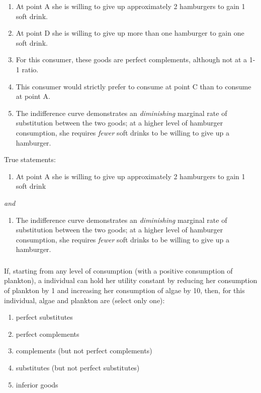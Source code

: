 \documentclass[]{article}
\providecommand{\tightlist}{%
  \setlength{\itemsep}{0pt}\setlength{\parskip}{0pt}}
\begin{document}
\begin{enumerate}
\def\labelenumi{\Alph{enumi}.}
\item
  At point A she is willing to give up approximately 2 hamburgers to
  gain 1 soft drink.
\item
  At point D she is willing to give up more than one hamburger to gain
  one soft drink.
\item
  For this consumer, these goods are perfect complements, although not
  at a 1-1 ratio.
\item
  This consumer would strictly prefer to consume at point C than to
  consume at point A.
\item
  The indifference curve demonstrates an \emph{diminishing} marginal
  rate of substitution between the two goods; at a higher level of
  hamburger consumption, she requires \emph{fewer} soft drinks to be
  willing to give up a hamburger.
\end{enumerate}

True statements:

\begin{enumerate}
\def\labelenumi{(\alph{enumi})}
\tightlist
\item
  At point A she is willing to give up approximately 2 hamburgers to
  gain 1 soft drink
\end{enumerate}

\emph{and}

\begin{enumerate}
\def\labelenumi{(\alph{enumi})}
\setcounter{enumi}{4}
\tightlist
\item
  The indifference curve demonstrates an \emph{diminishing} marginal
  rate of substitution between the two goods; at a higher level of
  hamburger consumption, she requires \emph{fewer} soft drinks to be
  willing to give up a hamburger.
\end{enumerate}

\hypertarget{section-6}{%
\subsubsection{}\label{section-6}}

If, starting from any level of consumption (with a positive consumption
of plankton), a individual can hold her utility constant by reducing her
consumption of plankton by 1 and increasing her consumption of algae by
10, then, for this individual, algae and plankton are (select only one):

\begin{enumerate}
\def\labelenumi{\Alph{enumi}.}
\item
  perfect substitutes
\item
  perfect complements
\item
  complements (but not perfect complements)
\item
  substitutes (but not perfect substitutes)
\item
  inferior goods
\end{enumerate}
\end{document}
